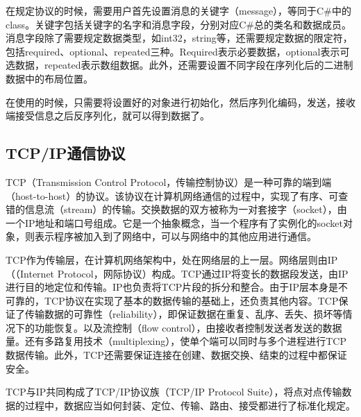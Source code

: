 在规定协议的时候，需要用户首先设置消息的关键字（message），等同于C\#中的class。关键字包括关键字的名字和消息字段，分别对应C\#总的类名和数据成员。消息字段除了需要规定数据类型，如int32，string等，还需要规定数据的限定符，包括required、optional、repeated三种。Required表示必要数据，optional表示可选数据，repeated表示数组数据。此外，还需要设置不同字段在序列化后的二进制数据中的布局位置。

在使用的时候，只需要将设置好的对象进行初始化，然后序列化编码，发送，接收端接受信息之后反序列化，就可以得到数据了。

\subsection{TCP/IP通信协议}
	TCP（Transmission Control Protocol，传输控制协议）是一种可靠的端到端（host-to-host）的协议。该协议在计算机网络通信的过程中，实现了有序、可查错的信息流（stream）的传输。交换数据的双方被称为一对套接字（socket），由一个IP地址和端口号组成。它是一个抽象概念，当一个程序有了实例化的socket对象，则表示程序被加入到了网络中，可以与网络中的其他应用进行通信。
	
	TCP作为传输层，在计算机网络架构中，处在网络层的上一层。网络层则由IP（（Internet Protocol，网际协议）构成。TCP通过IP将变长的数据段发送，由IP进行目的地定位和传输。IP也负责将TCP片段的拆分和整合。由于IP层本身是不可靠的，TCP协议在实现了基本的数据传输的基础上，还负责其他内容。TCP保证了传输数据的可靠性（reliability），即保证数据在重复、乱序、丢失、损坏等情况下的功能恢复。以及流控制（flow control），由接收者控制发送者发送的数据量。还有多路复用技术（multiplexing），使单个端可以同时与多个进程进行TCP数据传输。此外，TCP还需要保证连接在创建、数据交换、结束的过程中都保证安全。
	
	TCP与IP共同构成了TCP/IP协议族（TCP/IP Protocol Suite），将点对点传输数据的过程中，数据应当如何封装、定位、传输、路由、接受都进行了标准化规定。